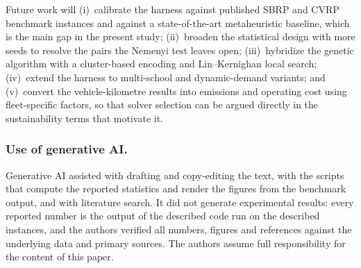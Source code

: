 \documentclass[runningheads]{llncs}
\begin{document}
Future work will (i)~calibrate the harness against published SBRP and
CVRP benchmark instances and against a state-of-the-art metaheuristic
baseline, which is the main gap in the present study;
(ii)~broaden the statistical design with more seeds to resolve the pairs
the Nemenyi test leaves open; (iii)~hybridize the genetic algorithm with
a cluster-based encoding and Lin--Kernighan local search;
(iv)~extend the harness to multi-school and dynamic-demand variants; and
(v)~convert the vehicle-kilometre results into emissions and operating
cost using fleet-specific factors, so that solver selection can be
argued directly in the sustainability terms that motivate it.

\subsubsection{Use of generative AI.}
Generative AI assisted with drafting and copy-editing the text, with the
scripts that compute the reported statistics and render the figures from the
benchmark output, and with literature search. It did not generate experimental
results: every reported number is the output of the described code run on the
described instances, and the authors verified all numbers, figures and
references against the underlying data and primary sources. The authors assume
full responsibility for the content of this paper.



\end{document}

